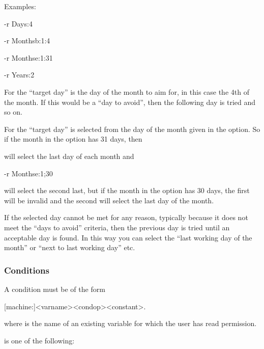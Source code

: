 Examples:

\begin{expara}

{}-r Days:4

{}-r Monthsb:1:4

{}-r Monthse:1:31

{}-r Years:2

\end{expara}

For  the ``target day'' is the day of the month to aim for, in this case the 4th of the month.
If this would be a ``day to avoid'', then the following day is tried and so on.

For  the ``target day'' is selected from the day of the month given in the  option. So if the month in the
 option has 31 days, then 

will select the last day of each month and

\begin{expara}

{}-r Monthse:1;30

\end{expara}

will select the second last, but if the month in the  option has 30 days, the first will be invalid and the second will select the last day of the month.

If the selected day cannot be met for any reason, typically because it does not meet the ``days to avoid'' criteria,
then the previous day is tried until an acceptable day is found. In this way you can select the ``last working day of the
month'' or ``next to last working day'' etc.

\subsubsection{Conditions}
A condition must be of the form

\begin{expara}

[machine:]{\textless}varname{\textgreater}{\textless}condop{\textgreater}{\textless}constant{\textgreater}.

\end{expara}

where  is the name of an existing variable for which the user has read permission.

 is one of the following:

